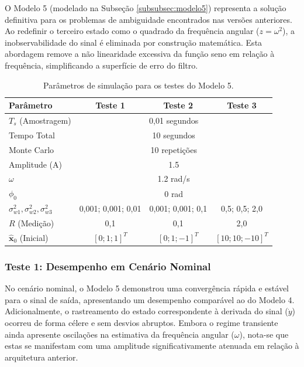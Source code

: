 \documentclass[a4paper,12pt]{article}
\begin{document}
O Modelo 5 (modelado na Subseção \ref{subsubsec:modelo5}) representa a solução definitiva para os problemas de ambiguidade encontrados nas versões anteriores. Ao redefinir o terceiro estado como o quadrado da frequência angular ($z = \omega^2$), a inobservabilidade do sinal é eliminada por construção matemática. Esta abordagem remove a não linearidade excessiva da função seno em relação à frequência, simplificando a superfície de erro do filtro.

\begin{table}[H]
\centering
\caption{Parâmetros de simulação para os testes do Modelo 5.}
\label{tab:parametros_m5}
\begin{tabular}{l|c|c|c}
\hline
\textbf{Parâmetro} & \textbf{Teste 1} & \textbf{Teste 2} & \textbf{Teste 3} \\ \hline
$T_s$ (Amostragem) & \multicolumn{3}{c}{0,01 segundos} \\
Tempo Total & \multicolumn{3}{c}{10 segundos} \\ 
Monte Carlo & \multicolumn{3}{c}{10 repetições} \\ 
Amplitude (A) & \multicolumn{3}{c}{1.5} \\ 
$\omega$ & \multicolumn{3}{c}{1.2 rad/s} \\ 
$\phi_0$ & \multicolumn{3}{c}{0 rad} \\ \hline
$\sigma^2_{w1}, \sigma^2_{w2}, \sigma^2_{w3}$ & 0,001; 0,001; 0,01 & 0,001; 0,001; 0,1 & 0,5; 0,5; 2,0 \\ 
$R$ (Medição) & 0,1 & 0,1 & 2,0 \\ 
$\hat{\mathbf{x}}_0$ (Inicial) & $[0; 1; 1]^T$ & $[0; 1; -1]^T$ & $[10; 10; -10]^T$ \\ \hline
\end{tabular}
\end{table}

\subsubsection{Teste 1: Desempenho em Cenário Nominal}

No cenário nominal, o Modelo 5 demonstrou uma convergência rápida e estável para o sinal de saída, apresentando um desempenho comparável ao do Modelo 4. Adicionalmente, o rastreamento do estado correspondente à derivada do sinal ($\dot{y}$) ocorreu de forma célere e sem desvios abruptos. Embora o regime transiente ainda apresente oscilações na estimativa da frequência angular ($\omega$), nota-se que estas se manifestam com uma amplitude significativamente atenuada em relação à arquitetura anterior.
\end{document}
